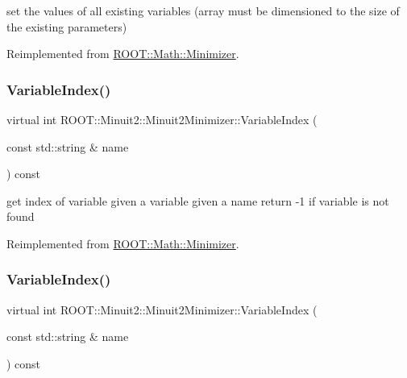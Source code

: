 set the values of all existing variables (array must be dimensioned to the size of the existing parameters) 



Reimplemented from \mbox{\hyperlink{classROOT_1_1Math_1_1Minimizer_ac8368efbd59da8e0b8bc0a0966309609}{R\+O\+O\+T\+::\+Math\+::\+Minimizer}}.

\mbox{\label{classROOT_1_1Minuit2_1_1Minuit2Minimizer_a93839e851d16fff50898af2159d8863d}} 
\subsubsection{\texorpdfstring{VariableIndex()}{VariableIndex()}\hspace{0.1cm}{\footnotesize\ttfamily [1/2]}}
{\footnotesize\ttfamily virtual int R\+O\+O\+T\+::\+Minuit2\+::\+Minuit2\+Minimizer\+::\+Variable\+Index (\begin{DoxyParamCaption}\item[{const std\+::string \&}]{name }\end{DoxyParamCaption}) const\hspace{0.3cm}{\ttfamily [virtual]}}

get index of variable given a variable given a name return -\/1 if variable is not found 

Reimplemented from \mbox{\hyperlink{classROOT_1_1Math_1_1Minimizer_a5f7ff3bdda1f4b1d9e5e1150091a86c5}{R\+O\+O\+T\+::\+Math\+::\+Minimizer}}.

\mbox{\label{classROOT_1_1Minuit2_1_1Minuit2Minimizer_a93839e851d16fff50898af2159d8863d}} 
\subsubsection{\texorpdfstring{VariableIndex()}{VariableIndex()}\hspace{0.1cm}{\footnotesize\ttfamily [2/2]}}
{\footnotesize\ttfamily virtual int R\+O\+O\+T\+::\+Minuit2\+::\+Minuit2\+Minimizer\+::\+Variable\+Index (\begin{DoxyParamCaption}\item[{const std\+::string \&}]{name }\end{DoxyParamCaption}) const\hspace{0.3cm}{\ttfamily [virtual]}}

